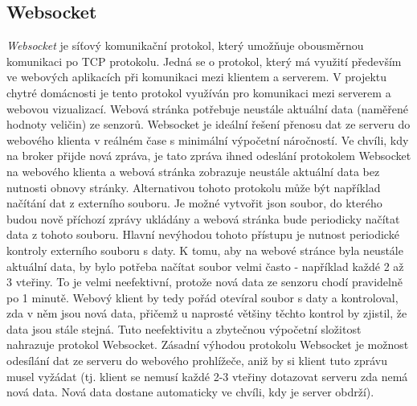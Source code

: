 \subsection*{Websocket}
\textit{Websocket} je síťový komunikační protokol, který umožňuje obousměrnou komunikaci po TCP protokolu. Jedná se o protokol, který má využití především ve webových aplikacích při komunikaci mezi klientem a serverem. V projektu chytré domácnosti je tento protokol využíván pro komunikaci mezi serverem a webovou vizualizací. Webová stránka potřebuje neustále aktuální data (naměřené hodnoty veličin) ze senzorů. Websocket je ideální řešení přenosu dat ze serveru do webového klienta v reálném čase s minimální výpočetní náročností. Ve chvíli, kdy na broker přijde nová zpráva, je tato zpráva ihned odeslání protokolem Websocket na webového klienta a webová stránka zobrazuje neustále aktuální data bez nutnosti obnovy stránky. Alternativou tohoto protokolu může být například načítání dat z externího souboru. Je možné vytvořit json soubor, do kterého budou nově příchozí zprávy ukládány a webová stránka bude periodicky načítat data z tohoto souboru. Hlavní nevýhodou tohoto přístupu je nutnost periodické kontroly externího souboru s daty. K tomu, aby na webové stránce byla neustále aktuální data, by bylo potřeba načítat soubor velmi často - například každé 2 až 3 vteřiny. To je velmi neefektivní, protože nová data ze senzoru chodí pravidelně po 1 minutě. Webový klient by tedy pořád otevíral soubor s daty a kontroloval, zda v něm jsou nová data, přičemž u naprosté většiny těchto kontrol by zjistil, že data jsou stále stejná. Tuto neefektivitu a zbytečnou výpočetní složitost nahrazuje protokol Websocket. Zásadní výhodou protokolu Websocket je možnost odesílání dat ze serveru do webového prohlížeče, aniž by si klient tuto zprávu musel vyžádat (tj. klient se nemusí každé 2-3 vteřiny dotazovat serveru zda nemá nová data. Nová data dostane automaticky ve chvíli, kdy je server obdrží).